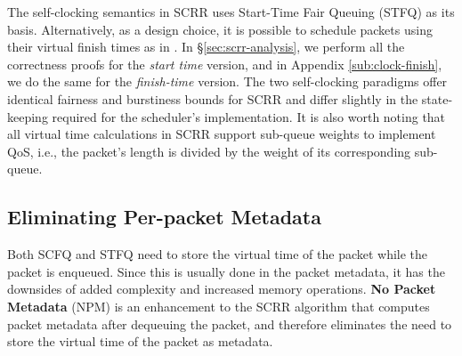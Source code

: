 The self-clocking semantics in SCRR uses Start-Time Fair Queuing (STFQ)
\cite{stfq} as its basis. Alternatively, as a design choice, it is possible to
schedule packets using their virtual finish times as in \cite{scfq}.
In \S\ref{sec:scrr-analysis}, we perform all the correctness proofs for the
\textit{start time} version, and in Appendix \ref{sub:clock-finish}, we
do the same for the \textit{finish-time} version. The two self-clocking paradigms offer identical fairness and burstiness bounds for SCRR and differ slightly in the state-keeping required for the scheduler's implementation. 
It is also worth noting that all virtual time calculations in SCRR support sub-queue weights to implement QoS, i.e., the packet's length is divided by the weight of its corresponding sub-queue. 



\subsection{Eliminating Per-packet Metadata}
\label{sec:npm}

Both SCFQ \cite{scfq} and STFQ \cite{stfq} need to store the virtual time of the packet while
the packet is enqueued. Since this is usually done in the packet
metadata, it has the downsides of added complexity and increased memory operations. \textbf{No Packet Metadata} (NPM) is an enhancement to 
the SCRR algorithm that computes packet metadata after dequeuing the
packet, and therefore eliminates the need to store the virtual
time of the packet as metadata.

